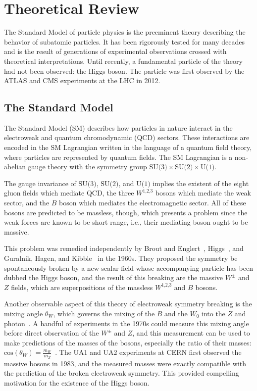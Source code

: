 \chapter[Theoretical Review][Theoretical Review]{Theoretical Review}
\label{chap:standardmodel}

The Standard Model of particle physics is the preeminent theory describing the behavior of subatomic particles. It has been rigorously tested for many decades and is the result of generations of experimental observations crossed with theoretical interpretations. Until recently, a fundamental particle of the theory had not been observed: the Higgs boson. The particle was first observed by the ATLAS and CMS experiments at the LHC in 2012.

\section{The Standard Model}

The Standard Model (SM) describes how particles in nature interact in the electroweak and quantum chromodynamic (QCD) sectors. These interactions are encoded in the SM Lagrangian written in the language of a quantum field theory, where particles are represented by quantum fields. The SM Lagrangian is a non-abelian gauge theory with the symmetry group $\text{SU(3)}\times\text{SU(2)}\times\text{U(1)}$. 

The gauge invariance of $\text{SU(3)}$, $\text{SU(2)}$, and $\text{U(1)}$ implies the existent of the eight gluon fields which mediate QCD, the three $W^\text{1,2,3}$ bosons which mediate the weak sector, and the $B$ boson which mediates the electromagnetic sector. All of these bosons are predicted to be massless, though, which presents a problem since the weak forces are known to be short range, i.e., their mediating boson ought to be massive.

This problem was remedied independently by Brout and Englert~\cite{1964.Englert.symmetry_breaking}, Higgs~\cite{1964.Higgs.Broken_Symmetries_1,1964.Higgs.Broken_Symmetries_2}, and Guralnik, Hagen, and Kibble~\cite{1964.Guralnik-Hagen-Kibble.symmetry_breaking} in the 1960s. They proposed the symmetry be spontaneously broken by a new scalar field whose accompanying particle has been dubbed the Higgs boson, and the result of this breaking are the massive $W^\pm$ and $Z$ fields, which are superpositions of the massless $W^\text{1,2,3}$ and $B$ bosons. 

Another observable aspect of this theory of electroweak symmetry breaking is the mixing angle $\theta_W$, which governs the mixing of the $B$ and the $W_\text{0}$ into the $Z$ and photon~\cite{}. A handful of experiments in the 1970s could measure this mixing angle before direct observation of the $W^\pm$ and $Z$, and this measurement can be used to make predictions of the masses of the bosons, especially the ratio of their masses: $\text{cos}(\theta_W) = \frac{m_W}{m_Z}$~\cite{1981.weinberg-angle-1,1981.weinberg-angle-2}. The UA1 and UA2 experiments at CERN first observed the massive bosons in 1983, and the measured masses were exactly compatible with the prediction of the broken electroweak symmetry. This provided compelling motivation for the existence of the Higgs boson.


